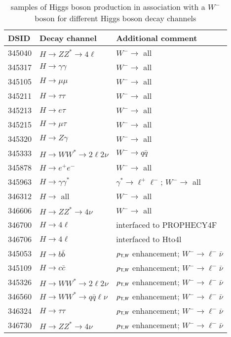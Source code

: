 \begin{table}[!htbp]
\begin{center}
\caption{\POWPY[8] samples of Higgs boson production in association with a $W^{-}$ boson for different Higgs boson decay channels} 
\begin{tabular}{ l | l | l}
\hline
DSID   & Decay channel & Additional comment \\
\hline
345040 & $H\to ZZ^{*} \to 4\ell$ & $W^{-}\to$ all\\
345317 & $H\to \gamma\gamma$ & $W^{-}\to$ all\\
345105 & $H\to \mu\mu$ &  $W^{-}\to$ all\\
345211 & $H\to \tau\tau$ &  $W^{-}\to$ all\\
345213 & $H\to e \tau $ & $W^{-}\to$ all\\
345215 & $H\to \mu \tau $ & $W^{-}\to$ all\\
345320 & $H\to Z\gamma$ & $W^{-}\to$ all\\
345333 & $H\to WW^{*} \to 2\ell2\nu $ & $W^{-} \to q\bar{q}$ \\
345878 & $H\to e^{+}e^{-}$ & $W^{-}\to$ all\\
345963 & $H\to \gamma\gamma^{*}$ & $\gamma^{*}\to \ell^{+}\ell^{-}$; $W^{-}\to$ all\\
346312 & $H\to$ all & $W^{-}\to$ all\\ 
346606 & $H\to ZZ^{*} \to 4\nu $ & $W^{-}\to$ all\\
346700 & $H \to 4\ell$ & interfaced to PROPHECY4F \\
346706 & $H \to 4\ell$ & interfaced to Hto4l \\
345053 & $H\to b\bar{b}$ & $p_{{\textrm T},W}$ enhancement; $W^{-}\to \ell^{-}\bar{\nu}$ \\
345109 & $H\to c\bar{c}$ & $p_{{\textrm T},W}$ enhancement; $W^{-}\to \ell^{-}\bar{\nu}$  \\
345326 & $H\to WW^{*} \to 2\ell2\nu$ & $p_{{\textrm T},W}$ enhancement;  $W^{-}\to \ell^{-}\bar{\nu}$ \\
346560 & $H\to WW^{*} \to q\bar{q}\ell\nu$ & $p_{{\textrm T},W}$ enhancement; $W^{-}\to \ell^{-}\bar{\nu}$ \\
346324 & $H\to \tau\tau$ & $p_{{\textrm T},W}$ enhancement; $W^{-}\to \ell^{-}\bar{\nu}$ \\
346730 & $H\to ZZ^{*} \to 4\nu$ & $p_{{\textrm T},W}$ enhancement; $W^{-}\to \ell^{-}\bar{\nu}$ \\
\hline
\end{tabular}
\end{center}
\end{table}


